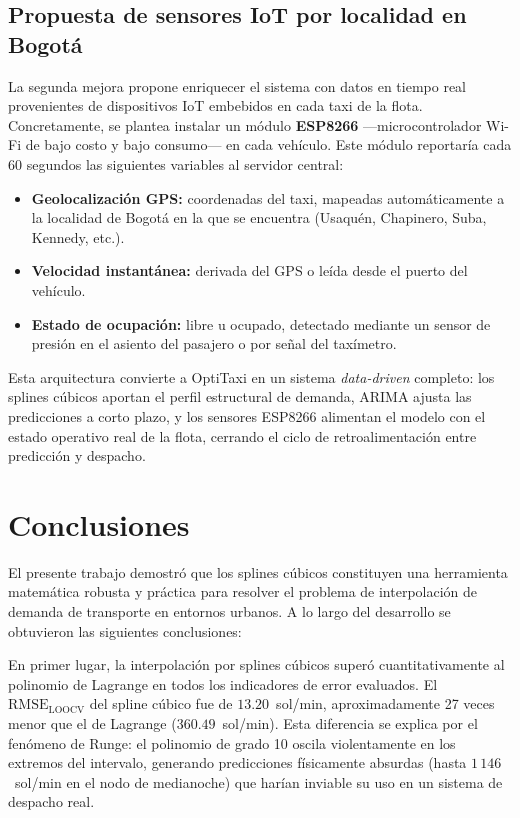 \documentclass[conference]{IEEEtran}
\begin{document}
\subsection{Propuesta de sensores IoT por localidad en Bogotá}

La segunda mejora propone enriquecer el sistema con datos en tiempo real provenientes de dispositivos IoT embebidos en
cada taxi de la flota. Concretamente, se plantea instalar un módulo \textbf{ESP8266} —microcontrolador Wi-Fi de bajo
costo y bajo consumo— en cada vehículo. Este módulo reportaría cada 60 segundos las siguientes variables al servidor
central:

\begin{itemize}
  \item \textbf{Geolocalización GPS:} coordenadas del taxi, mapeadas automáticamente a la localidad de Bogotá en la que
    se encuentra (Usaquén, Chapinero, Suba, Kennedy, etc.).

  \item \textbf{Velocidad instantánea:} derivada del GPS o leída desde el puerto del vehículo.

  \item \textbf{Estado de ocupación:} libre u ocupado, detectado mediante un sensor de presión en el asiento del pasajero
    o por señal del taxímetro.
\end{itemize}


Esta arquitectura convierte a OptiTaxi en un sistema \textit{data-driven} completo: los splines cúbicos aportan el perfil
estructural de demanda, ARIMA ajusta las predicciones a corto plazo, y los sensores ESP8266 alimentan el modelo con el
estado operativo real de la flota, cerrando el ciclo de retroalimentación entre predicción y despacho.

\section{Conclusiones}

El presente trabajo demostró que los splines cúbicos constituyen una herramienta matemática robusta y práctica para
resolver el problema de interpolación de demanda de transporte en entornos urbanos. A lo largo del desarrollo se
obtuvieron las siguientes conclusiones:

En primer lugar, la interpolación por splines cúbicos superó cuantitativamente al polinomio de Lagrange en todos los
indicadores de error evaluados. El $\mathrm{RMSE}_{\mathrm{LOOCV}}$ del spline cúbico fue de $13.20$~sol/min,
aproximadamente 27 veces menor que el de Lagrange ($360.49$~sol/min). Esta diferencia se explica por el fenómeno de
Runge: el polinomio de grado 10 oscila violentamente en los extremos del intervalo, generando predicciones físicamente
absurdas (hasta $1\,146$~sol/min en el nodo de medianoche) que harían inviable su uso en un sistema de despacho real.
\end{document}
